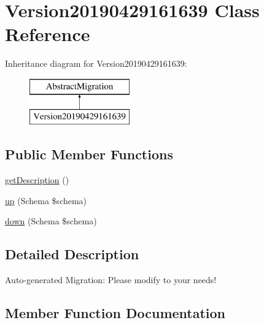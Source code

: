 \hypertarget{class_doctrine_migrations_1_1_version20190429161639}{}\section{Version20190429161639 Class Reference}
\label{class_doctrine_migrations_1_1_version20190429161639}
Inheritance diagram for Version20190429161639\+:\begin{figure}[H]
\begin{center}
\leavevmode
\includegraphics[height=2.000000cm]{class_doctrine_migrations_1_1_version20190429161639}
\end{center}
\end{figure}
\subsection*{Public Member Functions}
\begin{DoxyCompactItemize}
\item 
\mbox{\hyperlink{class_doctrine_migrations_1_1_version20190429161639_a2e7bb35c71bf1824456ceb944cb7a845}{get\+Description}} ()
\item 
\mbox{\hyperlink{class_doctrine_migrations_1_1_version20190429161639_a23eb1c1428e8ea2ab2cf798fc06ec421}{up}} (Schema \$schema)
\item 
\mbox{\hyperlink{class_doctrine_migrations_1_1_version20190429161639_aa8eb70255a46429d4d6165c778c9e5b9}{down}} (Schema \$schema)
\end{DoxyCompactItemize}


\subsection{Detailed Description}
Auto-\/generated Migration\+: Please modify to your needs! 

\subsection{Member Function Documentation}
\mbox{\label{class_doctrine_migrations_1_1_version20190429161639_aa8eb70255a46429d4d6165c778c9e5b9}} 
